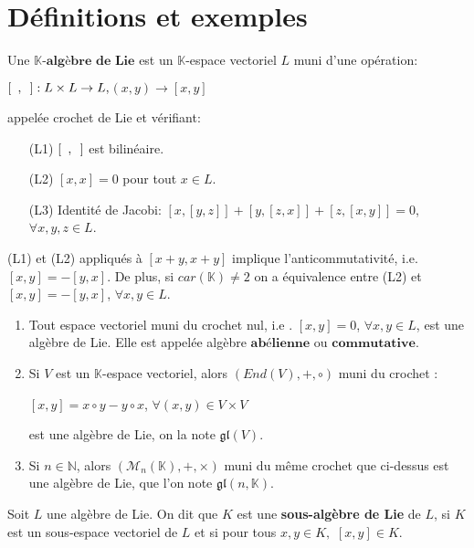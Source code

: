 \documentclass[a4paper,openany,12pt]{report}
\newcommand{\KK}{\mathbb{K}}
\newcommand{\NN}{\mathbb{N}}
\newcommand{\MM}{\mathcal{M}}
\newcommand{\gl}{\mathfrak{gl}}
\theoremstyle{break}
{\theorembodyfont{\upshape}
\newtheorem*{rmq}{Remarque :}
\newtheorem*{prv}{Preuve :}
\newtheorem*{ex}{Exemples :}
\newtheorem*{exe}{Exemple : }
\newtheorem*{nota}{Notation :}
\newtheorem*{dem}{D\'emonstration :}}
\begin{document}
\section{Définitions et exemples}
\begin{df}
\quad Une $\KK \textbf{-algèbre de Lie}$ est un $\KK$-espace vectoriel $L$ muni d'une opération:
\begin{center}
$[\enskip , \enskip ]: L\times L\to  L,$\quad$(x,y) \to [x,y] $ 
\end{center}
appelée crochet de Lie et vérifiant: 
\begin{center}
\begin{itemize}
\item[(L1)] $[\enskip , \enskip ]$ est bilinéaire.
\item[(L2)] $[x,x]=0$ pour tout $ x \in L $.
\item[(L3)] Identité de Jacobi:\quad
$[x,[y,z]]+[y,[z,x]]+[z,[x,y]]=0$, $\forall x,y,z \in L$.
\end{itemize}
\end{center}
\end{df}

\begin{rmq}
\quad (L1) et (L2) appliqués à $[x+y,x+y]$ implique l’anticommutativité, i.e. $[x,y]=-[y,x]$. De plus, si $car(\KK) \ne 2$ on a équivalence entre (L2) et $[x,y]=-[y,x]$, $\forall x,y \in L$.
\end{rmq}

\begin{ex}
\begin{enumerate}
\item Tout espace vectoriel muni du crochet nul, i.e . $[x,y]=0$, $\forall x,y \in L $, est une algèbre de Lie. Elle est appelée algèbre $\textbf{abélienne} $ ou $\textbf{commutative}$.

\item Si $V$ est un $\KK$-espace vectoriel,  alors $(End(V),+,\circ)$ muni du crochet : 
\begin{center}
$[x,y]=x \circ y-y \circ x$, $\forall (x,y) \in V \times V$
\end{center}
est une algèbre de Lie, on la note $\gl(V)$.

\item Si $ n \in \NN $, alors $(\MM_{n}(\KK),+,\times)$ muni du même crochet que ci-dessus est une algèbre de Lie, que l'on note $\gl(n,\KK)$.
\end{enumerate}
\end{ex}

\begin{df} 
\quad Soit $L$ une algèbre de Lie. On dit que $K$ est une \textbf{sous-algèbre de Lie} de $L$, si $K$ est un sous-espace vectoriel de $L$ et si pour tous $x , y \in K ,$ $[x,y] \in K$.
\end{df}
\end{document}
